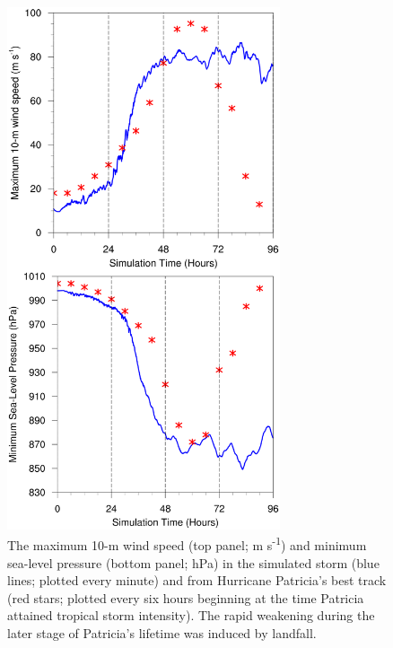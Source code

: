 \begin{figure}[ht]
\centerline{\includegraphics[width=19pc]{figures/vmax+pmin.png}}
\caption{The maximum 10-m wind speed (top panel; m s\textsuperscript{-1}) and minimum sea-level pressure (bottom panel; hPa) in the simulated storm (blue lines; plotted every minute) and from Hurricane Patricia's best track (red stars; plotted every six hours beginning at the time Patricia attained tropical storm intensity). The rapid weakening during the later stage of Patricia's lifetime was induced by landfall.}
\label{fig:vmax+pmin}
\end{figure}


